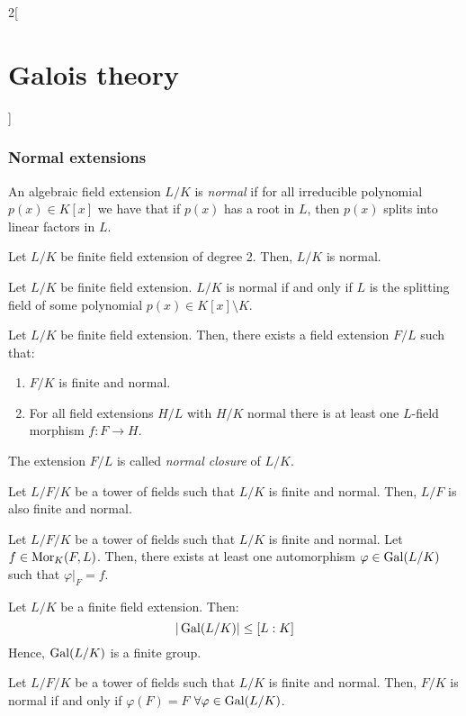 \documentclass[../../../main.tex]{subfiles}
\begin{document}
\begin{multicols}{2}[\section{Galois theory}]
  \subsubsection{Normal extensions}
  \begin{definition}
    An algebraic field extension $L/K$ is \emph{normal} if for all irreducible polynomial $p(x)\in K[x]$ we have that if $p(x)$ has a root in $L$, then $p(x)$ splits into linear factors in $L$.
  \end{definition}
  \begin{proposition}
    Let $L/K$ be finite field extension of degree 2. Then, $L/K$ is normal.
  \end{proposition}
  \begin{theorem}
    Let $L/K$ be finite field extension. $L/K$ is normal if and only if $L$ is the splitting field of some polynomial $p(x)\in K[x]\setminus K$.
  \end{theorem}
  \begin{corollary}
    Let $L/K$ be finite field extension. Then, there exists a field extension $F/L$ such that:
    \begin{enumerate}
      \item $F/K$ is finite and normal.
      \item For all field extensions $H/L$ with $H/K$ normal there is at least one $L$-field morphism $f:F\rightarrow H$.
    \end{enumerate}
    The extension $F/L$ is called \emph{normal closure} of $L/K$.
  \end{corollary}
  \begin{corollary}
    Let $L/F/K$ be a tower of fields such that $L/K$ is finite and normal. Then, $L/F$ is also finite and normal.
  \end{corollary}
  \begin{corollary}
    Let $L/F/K$ be a tower of fields such that $L/K$ is finite and normal. Let $f\in\operatorname{Mor}_K(F,L)$. Then, there exists at least one automorphism $\varphi\in\operatorname{Gal}(L/K)$ such that $\varphi|_F=f$.
  \end{corollary}
  \begin{corollary}
    Let $L/K$ be a finite field extension. Then: $$|\operatorname{Gal}(L/K)|\leq[L:K]$$ Hence, $\operatorname{Gal}(L/K)$ is a finite group.
  \end{corollary}
  \begin{corollary}
    Let $L/F/K$ be a tower of fields such that $L/K$ is finite and normal. Then, $F/K$ is normal if and only if $\varphi(F)=F$ $\forall\varphi\in\operatorname{Gal}(L/K)$.
  \end{corollary}

\end{multicols}
\end{document}
